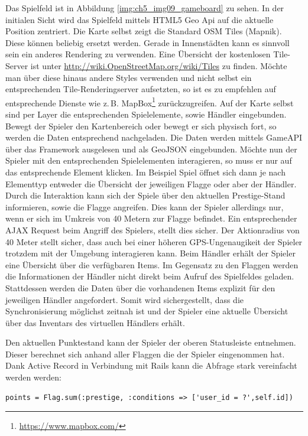 Das Spielfeld ist in Abbildung \ref{img:ch5_img09_gameboard} zu sehen. In der initialen Sicht wird das Spielfeld mittels HTML5 Geo Api auf die aktuelle Position zentriert. Die Karte selbst zeigt die Standard OSM Tiles (Mapnik). Diese können beliebig ersetzt werden. Gerade in Innenstädten kann es sinnvoll sein ein anderes Rendering zu verwenden. Eine Übersicht der kostenlosen Tile-Server ist unter \url{http://wiki.OpenStreetMap.org/wiki/Tiles} zu finden. Möchte man über diese hinaus andere Styles verwenden und nicht selbst ein entsprechenden Tile-Renderingserver aufsetzten, so ist es zu empfehlen auf entsprechende Dienste wie z.\,B. MapBox\footnote{\url{https://www.mapbox.com/}} zurückzugreifen. Auf der Karte selbst sind per Layer die entsprechenden Spielelemente, sowie Händler eingebunden.
Bewegt der Spieler den Kartenbereich oder bewegt er sich physisch fort, so werden die Daten entsprechend nachgeladen. Die Daten werden mittels GameAPI über das Framework ausgelesen und als GeoJSON eingebunden. Möchte nun der Spieler mit den entsprechenden Spielelementen interagieren, so muss er nur auf das entsprechende Element klicken. Im Beispiel Spiel öffnet sich dann je nach Elementtyp entweder die Übersicht der jeweiligen Flagge oder aber der Händler. Durch die Interaktion kann sich der Spiele über den aktuellen Prestige-Stand informieren, sowie die Flagge angreifen. Dies kann der Spieler allerdings nur, wenn er sich im Umkreis von 40 Metern zur Flagge befindet. Ein entsprechender AJAX Request beim Angriff des Spielers, stellt dies sicher. Der Aktionradius von 40 Meter stellt sicher, dass auch bei einer höheren GPS-Ungenaugikeit der Spieler trotzdem mit der Umgebung interagieren kann.
Beim Händler erhält der Spieler eine Übersicht über die verfügbaren Items. Im Gegensatz zu den Flaggen werden die Informationen der Händler nicht direkt beim Aufruf des Spielfeldes geladen. Stattdessen werden die Daten über die vorhandenen Items explizit für den jeweiligen Händler angefordert. Somit wird sichergestellt, dass die Synchronisierung möglichst zeitnah ist und der Spieler eine aktuelle Übersicht über das Inventars des virtuellen Händlers erhält.

Den aktuellen Punktestand kann der Spieler der oberen Statusleiste entnehmen. Dieser berechnet sich anhand aller Flaggen die der Spieler eingenommen hat. Dank Active Record in Verbindung mit Rails kann die Abfrage stark vereinfacht werden werden:
\\
\lstset{
   language=Ruby
}

\begin{lstlisting}[caption=Ruby - Abfrage der Spielerpunkte, label=code:ch5:activerecord01]
points = Flag.sum(:prestige, :conditions => ['user_id = ?',self.id])
\end{lstlisting}

